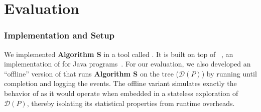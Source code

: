 
\section{Evaluation}\label{sec:experiment}

\subsubsection*{Implementation and Setup}

We implemented \textbf{Algorithm S} in a tool called \testor. 
It is built on top of \jmc~\cite{jmc}, an implementation of \trust for Java programs~\cite{condpor}.
For our evaluation, we also developed an ``offline'' version of \testor that runs \textbf{Algorithm S} 
on the tree ($\mathcal{D}(P)$) by running \jmc until completion and logging the events.
%
The offline variant simulates exactly the behavior of \testor as it would operate when embedded in a stateless \dpor exploration of $\mathcal{D}(P)$, thereby isolating its statistical properties from runtime overheads.

